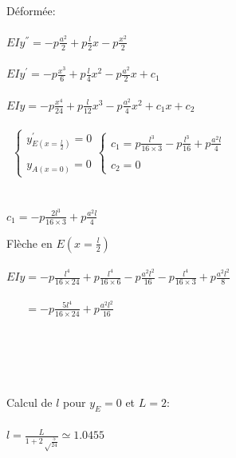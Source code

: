\documentclass[a4paper]{article}
\begin{document}
~\\
~\\
~\\
\begin{minipage}[t]{9.5cm}
Déformée:\\
~\\
$EIy^{''} =
- p\frac{a^2}{2}
+ p\frac{l}{2}x
- p\frac{x^2}{2}
$\\
~\\
$EIy^{'} =
- p\frac{x^3}{6}
+ p\frac{l}{4}x^2
- p\frac{a^2}{2}x + c_1
$\\
~\\
$EIy =
- p\frac{x^4}{24}
+ p\frac{l}{12}x^3
- p\frac{a^2}{4}x^2 + c_1x + c_2
$\\
~\\
~$
\begin{cases}
  y^{'}_{E(x=\frac{l}{2})} = 0\\~\\
  y_{A(x=0)} = 0
\end{cases}
\begin{cases}
  c_1 = p\frac{l^3}{16\times3} - p\frac{l^3}{16} + p\frac{a^2l}{4}\\~\\
  c_2 = 0
\end{cases}
$\\
~\\
~\\
$c_1 = -p\frac{2l^3}{16\times3} + p\frac{a^2l}{4}$
\end{minipage}
\begin{minipage}[t]{9.5cm}
Flèche en $E(x=\frac{l}{2})$\\
~\\
$EIy =
- p\frac{l^4}{16\times24}
+ p\frac{l^4}{16\times6}
- p\frac{a^2l^2}{16}
- p\frac{l^4}{16\times3}
+ p\frac{a^2l^2}{8}
$\\
~\\
$\phantom{EIy} =
- p\frac{5l^4}{16\times24}
+ p\frac{a^2l^2}{16}
$\\
~\\
\hfill
{}\\
~\\
~\\
~\\
Calcul de $l$ pour $y_E=0$ et $L=2$:\\
~\\
$l=\frac{L}{1+2\sqrt\frac{5}{24}} \simeq 1.0455$
\end{minipage}
\end{document}
